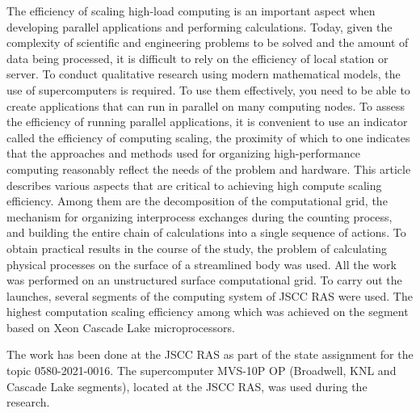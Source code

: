\documentclass[
11pt,%
tightenlines,%
twoside,%
onecolumn,%
nofloats,%
nobibnotes,%
nofootinbib,%
superscriptaddress,%
noshowpacs,%
centertags]%
{revtex4}
\begin{document}
The efficiency of scaling high-load computing is an important aspect when developing parallel applications and performing calculations.
Today, given the complexity of scientific and engineering problems to be solved and the amount of data being processed, it is difficult to rely on the efficiency of local station or server.
To conduct qualitative research using modern mathematical models, the use of supercomputers is required.
To use them effectively, you need to be able to create applications that can run in parallel on many computing nodes.
To assess the efficiency of running parallel applications, it is convenient to use an indicator called the efficiency of computing scaling, the proximity of which to one indicates that the approaches and methods used for organizing high-performance computing reasonably reflect the needs of the problem and hardware.
This article describes various aspects that are critical to achieving high compute scaling efficiency.
Among them are the decomposition of the computational grid, the mechanism for organizing interprocess exchanges during the counting process, and building the entire chain of calculations into a single sequence of actions.
To obtain practical results in the course of the study, the problem of calculating physical processes on the surface of a streamlined body was used.
All the work was performed on an unstructured surface computational grid.
To carry out the launches, several segments of the computing system of JSCC RAS were used.
The highest computation scaling efficiency among which was achieved on the segment based on Xeon Cascade Lake microprocessors.

\begin{acknowledgments}
The work has been done at the JSCC RAS as part of the state assignment for the topic 0580-2021-0016.
The supercomputer MVS-10P OP (Broadwell, KNL and Cascade Lake segments), located at the JSCC RAS, was used during the research.
\end{acknowledgments}
\end{document}
